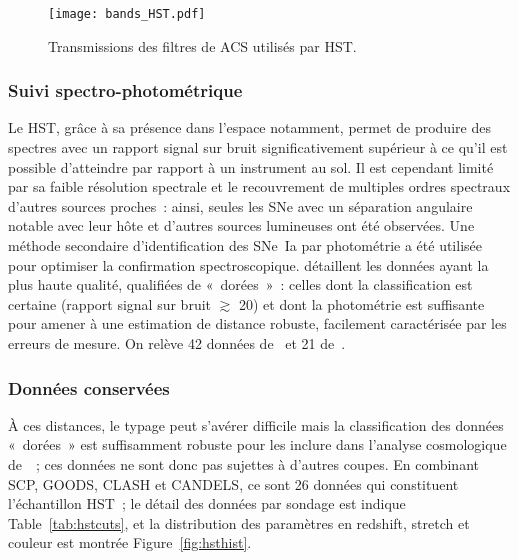\documentclass[../main/main.tex]{subfiles}
\begin{document}
\begin{figure}[!ht]
    \centering
    \texttt{[image: bands\_HST.pdf]}
    \captionsetup{justification=centering}
    \caption{Transmissions des filtres de ACS utilisés par HST.}
    \label{fig:hstbands}
\end{figure}

\subsubsection{Suivi spectro-photométrique}\label{sssec:hstspectro}

Le HST, grâce à sa présence dans l'espace notamment, permet de produire des
spectres avec un rapport signal sur bruit significativement supérieur à ce qu'il
est possible d'atteindre par rapport à un instrument au sol. Il est cependant
limité par sa faible résolution spectrale et le recouvrement de multiples ordres
spectraux d'autres sources proches~: ainsi, seules les SNe avec un séparation
angulaire notable avec leur hôte et d'autres sources lumineuses ont été
observées. Une méthode secondaire d'identification des SNe~Ia par photométrie a
été utilisée pour optimiser la confirmation spectroscopique. \cite{riess2007}
détaillent les données ayant la plus haute qualité, qualifiées de «~dorées~»~:
celles dont la classification est certaine (rapport signal sur bruit $\gtrsim$
20) et dont la photométrie est suffisante pour amener à une estimation de
distance robuste, facilement caractérisée par les erreurs de mesure. On relève
42 données de~\cite{strolger2004} et 21 de~\cite{riess2007}.

\subsubsection{Données conservées}\label{sssec:hstdata}

À ces distances, le typage peut s'avérer difficile mais la classification des
données «~dorées~» est suffisamment robuste pour les inclure dans l'analyse
cosmologique de~\citep{scolnic2018}~; ces données ne sont donc pas sujettes à
d'autres coupes. En combinant SCP, GOODS, CLASH et CANDELS, ce sont 26 données
qui constituent l'échantillon HST~; le détail des données par sondage est
indique Table~\ref{tab:hstcuts}, et la distribution des paramètres en redshift,
stretch et couleur est montrée Figure~\ref{fig:hsthist}.
\end{document}
